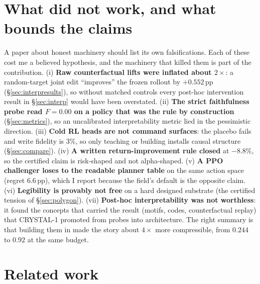 \documentclass[11pt]{article}
\begin{document}
\section{What did not work, and what bounds the claims}
\label{sec:nulls}

A paper about honest machinery should list its own falsifications. Each of these cost me a
believed hypothesis, and the machinery that killed them is part of the contribution.
(i) \textbf{Raw counterfactual lifts were inflated about $2\times$}: a random-target joint edit
``improves'' the frozen rollout by $+0.552$\,pp (\S\ref{sec:interpresults}), so without matched
controls every post-hoc intervention result in \S\ref{sec:interp} would have been overstated.
(ii) \textbf{The strict faithfulness probe read $F{=}0.00$ on a policy that was the rule by
construction} (\S\ref{sec:metrics}), so an uncalibrated interpretability metric lied in the
pessimistic direction. (iii) \textbf{Cold RL heads are not command surfaces}: the placebo fails
and write fidelity is $3\%$, so only teaching or building installs causal structure
(\S\ref{sec:compare}). (iv) \textbf{A written return-improvement rule closed} at $-8.8\%$, so the
certified claim is risk-shaped and not alpha-shaped. (v) \textbf{A PPO challenger loses to the
readable planner table} on the same action space (regret $6.6$\,pp), which I report because the
field's default is the opposite claim. (vi) \textbf{Legibility is provably not free} on a hard
designed substrate (the certified tension of \S\ref{sec:polygon}). (vii) \textbf{Post-hoc
interpretability was not worthless}: it found the concepts that carried the result (motifs, codes,
counterfactual replay) that CRYSTAL-1 promoted from probes into architecture. The right summary is
that building them in made the story about $4\times$ more compressible, from $0.244$ to $0.92$ at
the same budget.

\section{Related work}
\label{sec:related}
\end{document}

